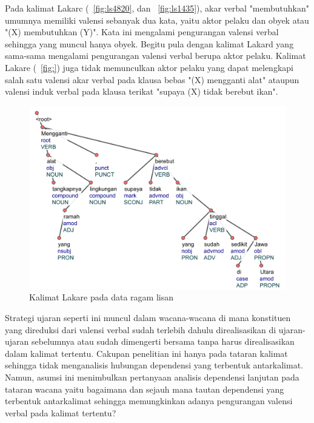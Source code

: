 Pada kalimat Lakarc (\pic~\ref{fig:ls4820}, dan \pic~\ref{fig:ls1435}), akar verbal "membutuhkan" umumnya memiliki valensi sebanyak dua kata, yaitu aktor pelaku dan obyek  atau "(X) membutuhkan (Y)". Kata ini mengalami pengurangan valensi verbal sehingga yang muncul hanya obyek. Begitu pula dengan kalimat Lakard yang sama-sama mengalami pengurangan valensi verbal berupa aktor pelaku. Kalimat Lakare (\pic~\ref{fig:}) juga tidak memunculkan aktor pelaku yang dapat melengkapi salah satu valensi akar verbal pada klausa bebas "(X) mengganti alat" ataupun valensi induk verbal pada klausa terikat "supaya (X) tidak berebut ikan".

\begin{figure}
	\centering \includegraphics[width=0.9
	\textwidth] {pics/ls1265.jpg} 
	\caption{Kalimat Lakare pada data ragam lisan}
	\label{fig:ls1265} 
\end{figure}

Strategi ujaran seperti ini muncul dalam wacana-wacana di mana konstituen yang direduksi dari valensi verbal sudah terlebih dahulu direalisasikan di ujaran-ujaran sebelumnya atau sudah dimengerti bersama tanpa harus direalisasikan dalam kalimat tertentu. Cakupan penelitian ini hanya pada tataran kalimat sehingga tidak menganalisis hubungan dependensi yang terbentuk antarkalimat. Namun, asumsi ini menimbulkan pertanyaan analisis dependensi lanjutan pada tataran wacana yaitu bagaimana dan sejauh mana tautan dependensi yang terbentuk antarkalimat sehingga memungkinkan adanya pengurangan valensi verbal pada kalimat tertentu?

